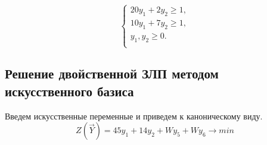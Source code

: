 \begin{equation}
\label{system}
\begin{cases}
20y_1 + 2y_2 \ge 1, \\
10y_1 + 7y_2 \ge 1, \\
y_1, y_2 \ge 0. \\
\end{cases}
\end{equation}

\subsection{Решение двойственной ЗЛП методом искусственного базиса}
Введем искусственные переменные и приведем к каноническому виду.
\begin{equation}
	Z(\vec{Y}) = 45y_1+14y_2+Wy_5+Wy_6 \to min
\end{equation}

